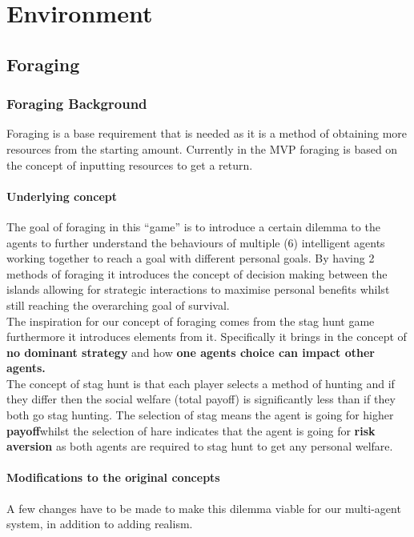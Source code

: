 \chapter{Environment}
\section{Foraging}
\subsection{Foraging Background}

Foraging is a base requirement that is needed as it is a method of obtaining more resources from the starting amount. Currently in the MVP foraging is based on the concept of inputting resources to get a return.\\

\subsubsection{Underlying concept}
The goal of foraging in this “game” is to introduce a certain dilemma to the agents to further understand the behaviours of multiple (6) intelligent agents working together to reach a goal with different personal goals. By having 2 methods of foraging it introduces the concept of decision making between the islands allowing for strategic interactions to maximise personal benefits whilst still reaching the overarching goal of survival.\\  

The inspiration for our concept of foraging comes from the stag hunt game furthermore it introduces elements from it. Specifically it brings in the concept of \textbf{no dominant strategy} and how \textbf{ one agents choice can impact other agents.}\\

The concept of stag hunt is that each player selects a method of hunting and if they differ then the social welfare (total payoff) is significantly less than if they both go stag hunting. The selection of stag means the agent is going for higher \textbf{payoff}whilst the selection of hare indicates that the agent is going for \textbf{risk aversion} as both agents are required to stag hunt to get any personal welfare. \\

\subsubsection{Modifications to the original concepts} 
A few changes have to be made to make this dilemma viable for our multi-agent system, in addition to adding realism. 

